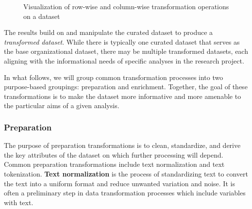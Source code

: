 \documentclass[
  letterpaper,
]{latex/krantz}
\theoremstyle{definition}
\theoremstyle{remark}
\begin{document}
\begin{figure}[H]


\caption{\label{fig-ud-transformations}Visualization of row-wise and
column-wise transformation operations on a dataset}

\end{figure}%

The results build on and manipulate the curated dataset to produce a
\emph{transformed dataset}. While there is typically one curated dataset
that serves as the base organizational dataset, there may be multiple
transformed datasets, each aligning with the informational needs of
specific analyses in the research project.

In what follows, we will group common transformation processes into two
purpose-based groupings: preparation and enrichment. Together, the goal
of these transformations is to make the dataset more informative and
more amenable to the particular aims of a given analysis.

\subsubsection{Preparation}\label{preparation}

The purpose of preparation transformations is to clean, standardize, and
derive the key attributes of the dataset on which further processing
will depend. Common preparation transformations include text
normalization and text tokenization. \textbf{Text normalization} is the
process of standardizing text to convert the text into a uniform format
and reduce unwanted variation and noise. It is often a preliminary step
in data transformation processes which include variables with text.
\end{document}
